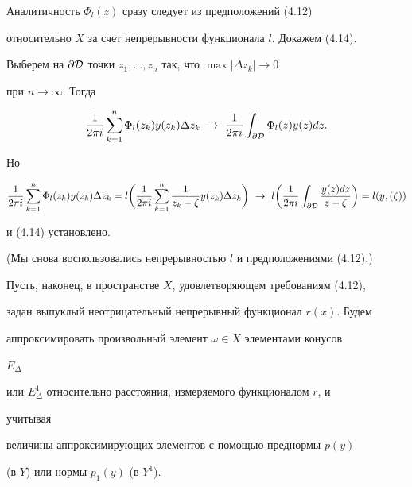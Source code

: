 


\begin{pf} 


Аналитичность $\Phi_l(z)$ сразу следует из предположений (4.12) 


относительно $X$ за счет непрерывности функционала $l$. Докажем (4.14). 


Выберем на $\partial\cal D$ точки $z_1,\dotsc,z_n$ так, что $\max|\Delta 


z_k|\to0$ 


при $n\to\infty$. Тогда 


$$ 


\frac{1}{2\pi i}\sum^n_{k=1} \Phi_l(z_k)y(z_k)\Delta z_k\ \to\ 


\frac{1}{2\pi i}\int_{\partial\cal D}\Phi_l(z)y(z)d z. 


$$ 


Но 


$$ 


\frac{1}{2\pi i}\sum^n_{k=1} \Phi_l(z_k)y(z_k)\Delta z_k= 


l\bigg(\frac{1}{2\pi i}\sum^n_{k=1} \frac{1}{z_k-\zeta} 


y(z_k)\Delta z_k\bigg)\ \to\ l\bigg(\frac{1}{2\pi i} 


\int_{\partial\cal D}\frac{y(z)d z}{z-\zeta}\bigg) =l(y,(\zeta))


$$ 


и (4.14) установлено. 


(Мы снова воспользовались непрерывностью $l$ и предположениями (4.12).) 


\end{pf} 


 


Пусть, наконец, в пространстве $X$, удовлетворяющем требованиям (4.12), 


задан выпуклый неотрицательный непрерывный функционал $r(x)$. Будем 


аппроксимировать произвольный элемент $\omega\in X$ элементами конусов 


$E_\Delta$ 


или $E^1_\Delta$ относительно расстояния, измеряемого функционалом $r$, и 


учитывая 


величины аппроксимирующих элементов с помощью преднормы $p(y)$ 


(в $Y$) или нормы $p_1(y)$ (в $Y^1$). 


 


